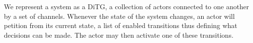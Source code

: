 
%
%

%



We represent a system as a DiTG, a collection of
actors connected to one another by a set of channels.  Whenever the state of the
system changes, an actor will petition from its current state, a list of enabled
transitions thus defining what decisions can be made.  The actor may then
activate one of these transitions.  

